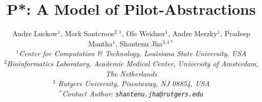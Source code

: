 \documentclass[conference]{IEEEtran}
\begin{document}

\title{P*: A Model of Pilot-Abstractions}

\author{
  Andre Luckow$^{1}$, Mark Santcroos$^{2,1}$, Ole Weidner$^{1}$, Andre Merzky$^{1}$, Pradeep Mantha$^{1}$, Shantenu Jha$^{3,1*}$\\[0.4em]
  \small{\emph{$^{1}$Center for Computation \& Technology, Louisiana State University, USA}}\\[-0em]
  \small{\emph{$^{2}$Bioinformatics Laboratory, Academic Medical Center, University of Amsterdam, The Netherlands}}\\[-0em]
  \small{\emph{$^{3}$ Rutgers University, Piscataway, NJ 08854, USA}}\\[-0em]
  \small{\emph{$^{*}$Contact Author: \texttt{shantenu.jha@rutgers.edu}}}\\[-0.3em]
  \up\up}

\date{}
\maketitle
\end{document}
